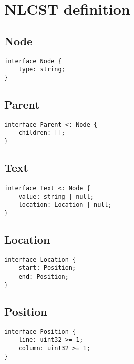 
\chapter{NLCST definition}\label{apendix-a-nlcst-definition}

\section*{Node}\label{node}

\begin{lstlisting}[language=IDL]
interface Node {
    type: string;
}
\end{lstlisting}

\section*{Parent}\label{parent}

\begin{lstlisting}[language=IDL]
interface Parent <: Node {
    children: [];
}
\end{lstlisting}

\section*{Text}\label{text}

\begin{lstlisting}[language=IDL]
interface Text <: Node {
    value: string | null;
    location: Location | null;
}
\end{lstlisting}

\section*{Location}\label{location}

\begin{lstlisting}[language=IDL]
interface Location {
    start: Position;
    end: Position;
}
\end{lstlisting}

\section*{Position}\label{position}

\begin{lstlisting}[language=IDL]
interface Position {
    line: uint32 >= 1;
    column: uint32 >= 1;
}
\end{lstlisting}

